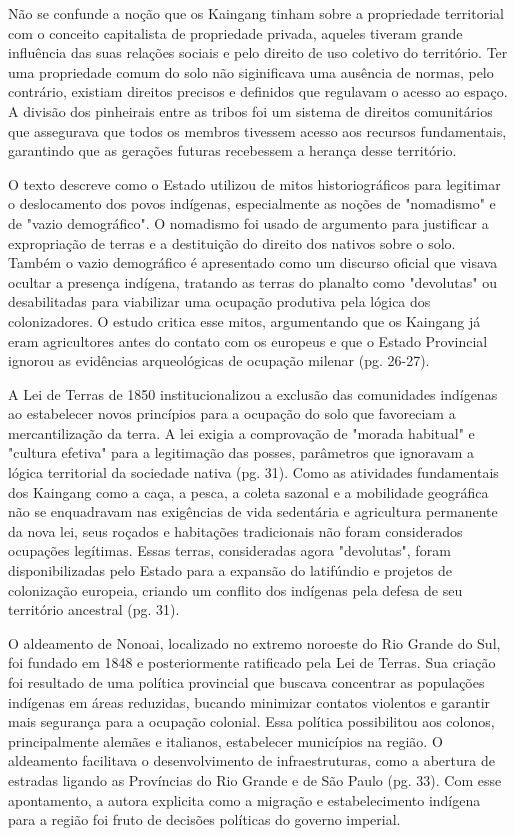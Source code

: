 \documentclass[12pt, a4paper]{article}
\begin{document}
Não se confunde a noção que os Kaingang tinham sobre a propriedade territorial com o conceito capitalista de propriedade privada, aqueles tiveram grande influência das suas relações sociais e pelo direito de uso coletivo do território. Ter uma propriedade comum do solo não siginificava uma ausência de normas, pelo contrário, existiam direitos precisos e definidos que regulavam o acesso ao espaço. A divisão dos pinheirais entre as tribos foi um sistema de direitos comunitários que assegurava que todos os membros tivessem acesso aos recursos fundamentais, garantindo que as gerações futuras recebessem a herança desse território.

O texto descreve como o Estado utilizou de mitos historiográficos para legitimar o deslocamento dos povos indígenas, especialmente as noções de "nomadismo" e de "vazio demográfico". O nomadismo foi usado de argumento para justificar a expropriação de terras e a destituição do direito dos nativos sobre o solo. Também o vazio demográfico é apresentado como um discurso oficial que visava ocultar a presença indígena, tratando as terras do planalto como "devolutas" ou desabilitadas para viabilizar uma ocupação produtiva pela lógica dos colonizadores. O estudo critica esse mitos, argumentando que os Kaingang já eram agricultores antes do contato com os europeus e que o Estado Provincial ignorou as evidências arqueológicas de ocupação milenar (pg. 26-27).

A Lei de Terras de 1850 institucionalizou a exclusão das comunidades indígenas ao estabelecer novos princípios para a ocupação do solo que favoreciam a mercantilização da terra. A lei exigia a comprovação de "morada habitual" e "cultura efetiva" para a legitimação das posses, parâmetros que ignoravam a lógica territorial da sociedade nativa (pg. 31). Como as atividades fundamentais dos Kaingang como a caça, a pesca, a coleta sazonal e a mobilidade geográfica não se enquadravam nas exigências de vida sedentária e agricultura permanente da nova lei, seus roçados e habitações tradicionais não foram considerados ocupações legítimas. Essas terras, consideradas agora "devolutas", foram disponibilizadas pelo Estado para a expansão do latifúndio e projetos de colonização europeia, criando um conflito dos indígenas pela defesa de seu território ancestral (pg. 31).


O aldeamento de Nonoai, localizado no extremo noroeste do Rio Grande do Sul, foi fundado em 1848 e posteriormente ratificado pela Lei de Terras. Sua criação foi resultado de uma política provincial que buscava concentrar as populações indígenas em áreas reduzidas, bucando minimizar contatos violentos e garantir mais segurança para a ocupação colonial. Essa política possibilitou aos colonos, principalmente alemães e italianos, estabelecer municípios na região. O aldeamento facilitava o desenvolvimento de infraestruturas, como a abertura de estradas ligando as Províncias do Rio Grande e de São Paulo (pg. 33). Com esse apontamento, a autora explicita como a migração e estabelecimento indígena para a região foi fruto de decisões políticas do governo imperial.
\end{document}
